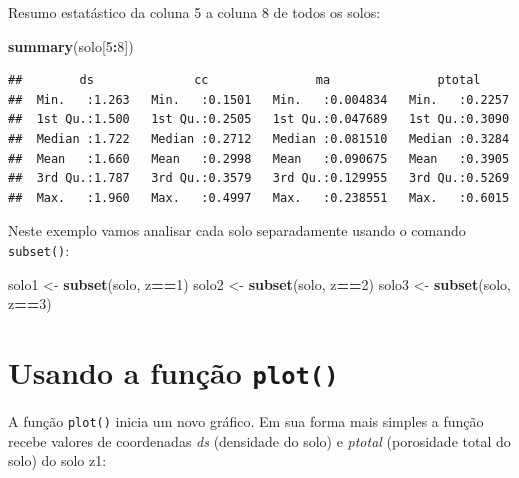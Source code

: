 \documentclass[
]{book}
\newenvironment{Shaded}{\begin{snugshade}}{\end{snugshade}}
\newcommand{\DecValTok}[1]{\textcolor[rgb]{0.00,0.00,0.81}{#1}}
\newcommand{\KeywordTok}[1]{\textcolor[rgb]{0.13,0.29,0.53}{\textbf{#1}}}
\newcommand{\NormalTok}[1]{#1}
\newcommand{\OperatorTok}[1]{\textcolor[rgb]{0.81,0.36,0.00}{\textbf{#1}}}
\newcommand{\StringTok}[1]{\textcolor[rgb]{0.31,0.60,0.02}{#1}}
\begin{document}
Resumo estatástico da coluna 5 a coluna 8 de todos os solos:

\begin{Shaded}
\begin{Highlighting}[]
\KeywordTok{summary}\NormalTok{(solo[}\DecValTok{5}\OperatorTok{:}\DecValTok{8}\NormalTok{])}
\end{Highlighting}
\end{Shaded}

\begin{verbatim}
##        ds              cc               ma               ptotal      
##  Min.   :1.263   Min.   :0.1501   Min.   :0.004834   Min.   :0.2257  
##  1st Qu.:1.500   1st Qu.:0.2505   1st Qu.:0.047689   1st Qu.:0.3090  
##  Median :1.722   Median :0.2712   Median :0.081510   Median :0.3284  
##  Mean   :1.660   Mean   :0.2998   Mean   :0.090675   Mean   :0.3905  
##  3rd Qu.:1.787   3rd Qu.:0.3579   3rd Qu.:0.129955   3rd Qu.:0.5269  
##  Max.   :1.960   Max.   :0.4997   Max.   :0.238551   Max.   :0.6015
\end{verbatim}

Neste exemplo vamos analisar cada solo separadamente usando o comando \texttt{subset()}:

\begin{Shaded}
\begin{Highlighting}[]
\NormalTok{solo1 <-}\StringTok{ }\KeywordTok{subset}\NormalTok{(solo, z}\OperatorTok{==}\DecValTok{1}\NormalTok{)}
\NormalTok{solo2 <-}\StringTok{ }\KeywordTok{subset}\NormalTok{(solo, z}\OperatorTok{==}\DecValTok{2}\NormalTok{)}
\NormalTok{solo3 <-}\StringTok{ }\KeywordTok{subset}\NormalTok{(solo, z}\OperatorTok{==}\DecValTok{3}\NormalTok{)}
\end{Highlighting}
\end{Shaded}

\hypertarget{usando-a-funuxe7uxe3o-plot}{%
\section{\texorpdfstring{Usando a função \texttt{plot()}}{Usando a função plot()}}\label{usando-a-funuxe7uxe3o-plot}}

A função \texttt{plot()} inicia um novo gráfico. Em sua forma mais simples a função
recebe valores de coordenadas \emph{ds} (densidade do solo) e \emph{ptotal} (porosidade total do solo) do solo z1:

\begin{Shaded}
\end{Shaded}
\end{document}
